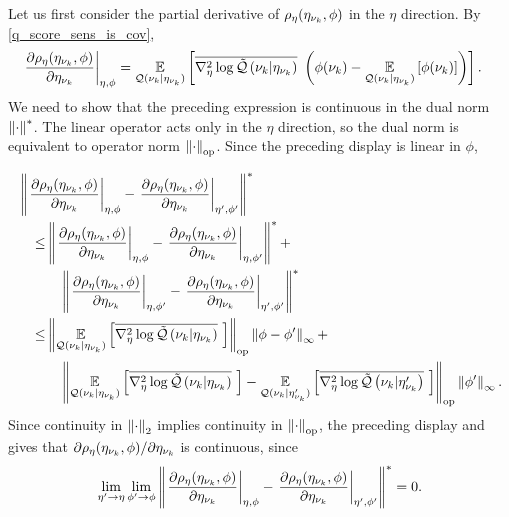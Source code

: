 Let us first consider the partial derivative of $\rho_\eta(\eta_{\nu_{k}}, \phi)$ in
the $\eta$ direction. By  \eqref{q_score_sens_is_cov},
%
\begin{align*}
%
\fracat{\partial \rho_\eta(\etanuk, \phi)}{\partial \etanuk}{\eta, \phi} ={}&
\expect{\q(\nuk \vert \etanuk)}{
   \lqhessbar{\nuk \vert \etanuk}
       \left(
        \phi(\nuk) - \expect{\q(\nuk \vert \etanuk)}{\phi(\nuk)}
       \right)
       }.
%
\end{align*}
%
We need to show that the preceding expression is continuous in the dual norm
$\left\Vert\cdot\right\Vert^*$.  The linear operator acts only in the $\eta$ direction, so
the dual norm is equivalent to operator norm $\left\Vert\cdot\right\Vert_{\mathrm{op}}$.  Since
the preceding display is linear in $\phi$,

%
\begin{align*}
%
\MoveEqLeft
%
\norm{\fracat{\partial \rho_\eta(\etanuk, \phi)}{\partial \etanuk}{\eta, \phi} -
      \fracat{\partial \rho_\eta(\etanuk, \phi)}{\partial \etanuk}{\eta', \phi'}
      }^* \\ \le
%
& \norm{\fracat{\partial \rho_\eta(\etanuk, \phi)}{\partial \etanuk}{\eta, \phi} -
        \fracat{\partial \rho_\eta(\etanuk, \phi)}{\partial \etanuk}{\eta, \phi'}
    }^* + \\&\quad
\norm{\fracat{\partial \rho_\eta(\etanuk, \phi)}{\partial \etanuk}{\eta, \phi'} -
      \fracat{\partial \rho_\eta(\etanuk, \phi)}{\partial \etanuk}{\eta', \phi'}
    }^* \\ \le
%
& \normop{
    \expect{\q(\nuk \vert \etanuk)}
           {\lqhessbar{\nuk \vert \etanuk}}
    } \norminf{\phi - \phi'} + \\&\quad
\normop{
    \expect{\q(\nuk \vert \etanuk)}{\lqhessbar{\nuk \vert \etanuk}} -
    \expect{\q(\nuk \vert \etanuk')}{\lqhessbar{\nuk \vert \etanuk'}}
  } \norminf{\phi'}.
%
\end{align*}
%
Since continuity in $\left\Vert\cdot\right\Vert_2$ implies continuity in $\left\Vert\cdot\right\Vert_{\mathrm{op}}$,
the preceding display and  gives that
$\partial \rho_\eta(\eta_{\nu_{k}}, \phi) / \partial \eta_{\nu_{k}}$ is continuous,
since
%
\begin{align*}
%
\lim_{\eta' \rightarrow \eta} \lim_{\phi' \rightarrow \phi}
\norm{\fracat{\partial \rho_\eta(\etanuk, \phi)}{\partial \etanuk}{\eta, \phi} -
      \fracat{\partial \rho_\eta(\etanuk, \phi)}{\partial \etanuk}{\eta', \phi'}
      }^* = 0.
%
\end{align*}


